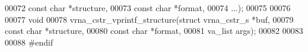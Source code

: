 \begin{DoxyCode}
00072                            \textcolor{keyword}{const} \textcolor{keywordtype}{char}         *structure,
00073                            \textcolor{keyword}{const} \textcolor{keywordtype}{char}         *format,
00074                            ...);
00075 
00076 
00077 \textcolor{keywordtype}{void}
00078 vrna\_cstr\_vprintf\_structure(\textcolor{keyword}{struct} vrna\_cstr\_s  *buf,
00079                             \textcolor{keyword}{const} \textcolor{keywordtype}{char}          *structure,
00080                             \textcolor{keyword}{const} \textcolor{keywordtype}{char}          *format,
00081                             va\_list             args);
00082 
00083 
00088 \textcolor{preprocessor}{#endif}
\end{DoxyCode}
